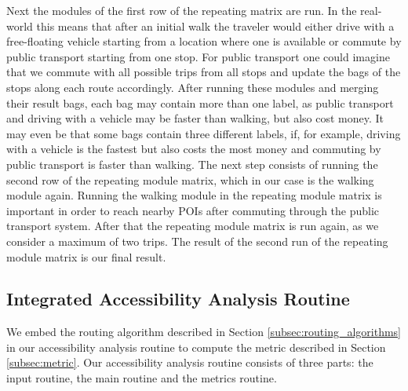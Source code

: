 Next the modules of the first row of the repeating matrix are run.
In the real-world this means that after an initial walk the traveler would either drive with a free-floating vehicle starting from a location where one is available or commute by public transport starting from one stop.
For public transport one could imagine that we commute with all possible trips from all stops and update the bags of the stops along each route accordingly.
After running these modules and merging their result bags, each bag may contain more than one label, as public transport and driving with a vehicle may be faster than walking, but also cost money.
It may even be that some bags contain three different labels, if, for example, driving with a vehicle is the fastest but also costs the most money and commuting by public transport is faster than walking.
The next step consists of running the second row of the repeating module matrix, which in our case is the walking module again.
Running the walking module in the repeating module matrix is important in order to reach nearby POIs after commuting through the public transport system.
After that the repeating module matrix is run again, as we consider a maximum of two trips.
The result of the second run of the repeating module matrix is our final result.



\subsection{Integrated Accessibility Analysis Routine}
\label{subsec:combining}

We embed the routing algorithm described in Section \ref{subsec:routing_algorithms} in our accessibility analysis routine to compute the metric described in Section \ref{subsec:metric}.
Our accessibility analysis routine consists of three parts: the input routine, the main routine and the metrics routine.


